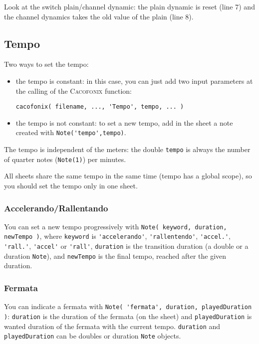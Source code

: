\documentclass{article}
\newcommand\cacofonix{\textsc{Cacofonix}\xspace}
\begin{document}
Look at the switch plain/channel dynamic: the plain dynamic is reset (line 7) and the channel dynamics takes the old value of the plain (line 8).

\subsection{Tempo}
\label{sec:Tempo}

Two ways to set the tempo:
\begin{itemize}
	\item the tempo is constant: in this case, you can just add two input parameters at the calling of the \cacofonix function:
\begin{lstlisting}
cacofonix( filename, ..., 'Tempo', tempo, ... )
\end{lstlisting}
	\item the tempo is not constant: to set a new tempo, add in the sheet a note created with \lstinline!Note('tempo',tempo)!.
\end{itemize}

The tempo is independent of the meters: the double \lstinline!tempo! is always the number of quarter notes (\lstinline!Note(1)!) per minutes.

All sheets share the same tempo in the same time (tempo has a global scope), so you should set the tempo only in one sheet.

\subsubsection{Accelerando/Rallentando}
\label{sec:AccelerandoRallentando}

You can set a new tempo progressively with \lstinline!Note( keyword, duration, newTempo )!, where \lstinline!keyword! is \lstinline!'accelerando'!, \lstinline!'rallentendo'!, \lstinline!'accel.'!, \lstinline!'rall.'!, \lstinline!'accel'! or \lstinline!'rall'!, \lstinline!duration! is the transition duration (a double or a duration \lstinline!Note!), and \lstinline!newTempo! is the final tempo, reached after the given duration.

\subsubsection{Fermata}
\label{sec:Fermata}

You can indicate a fermata with \lstinline!Note( 'fermata', duration, playedDuration )!: \lstinline!duration! is the duration of the fermata (on the sheet) and \lstinline!playedDuration! is wanted duration of the fermata with the current tempo. \lstinline!duration! and \lstinline!playedDuration! can be doubles or duration \lstinline!Note! objects.
\end{document}

